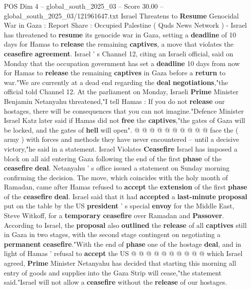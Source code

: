 \begin{textsample}{POS Dim 4 – global\_south\_2025\_03 – Score 30.00 – global\_south\_2025\_03/121961647.txt}  \label{ex:f4_pos_037}
Israel Threatens to \textbf{Resume} Genocidal War in Gaza : Report Share : Occupied Palestine ( Quds News Network ) - Israel has threatened to \textbf{resume} its genocide war in Gaza, setting a \textbf{deadline} of 10 days for Hamas to \textbf{release} the remaining \textbf{captives}, a move that violates the \textbf{ceasefire} \textbf{agreement}.
Israel ' s Channel 12, citing an Israeli official, said on Monday that the occupation government has set a \textbf{deadline} 10 days from now for Hamas to \textbf{release} the remaining \textbf{captives} in Gaza before a \textbf{return} to war."We are currently at a dead end regarding the \textbf{deal} \textbf{negotiations},"the official told Channel 12.
At the parliament on Monday, Israeli \textbf{Prime} Minister Benjamin Netanyahu threatened,"I tell Hamas : If you do not \textbf{release} our hostages, there will be consequences that you can not imagine."Defence Minister Israel Katz later said if Hamas did not \textbf{free} the \textbf{captives},"the gates of Gaza will be locked, and the gates of \textbf{hell} will open". @ @ @ @ @ @ @ @ @ @ face the ( army ) with forces and methods they have never encountered -- until a decisive victory,"he said in a statement.
Israel Violates \textbf{Ceasefire} Israel has imposed a block on all aid entering Gaza following the end of the first \textbf{phase} of the \textbf{ceasefire} \textbf{deal}.
Netanyahu ' s office issued a statement on Sunday morning confirming the decision.
The move, which coincides with the holy month of Ramadan, came after Hamas refused to \textbf{accept} the \textbf{extension} of the first \textbf{phase} of the \textbf{ceasefire} \textbf{deal}.
Israel said that it had \textbf{accepted} a \textbf{last-minute} \textbf{proposal} put on the table by the US \textbf{president} ' s special \textbf{envoy} for the Middle East, Steve Witkoff, for a \textbf{temporary} \textbf{ceasefire} over Ramadan and \textbf{Passover}.
According to Israel, the \textbf{proposal} also \textbf{outlined} the \textbf{release} of all \textbf{captives} still in Gaza in two stages, with the second stage contingent on negotiating a \textbf{permanent} \textbf{ceasefire}."With the end of \textbf{phase} one of the hostage \textbf{deal}, and in light of Hamas ' refusal to \textbf{accept} the US @ @ @ @ @ @ @ @ @ @ which Israel agreed, \textbf{Prime} Minister Netanyahu has decided that starting this morning all entry of goods and supplies into the Gaza Strip will cease,"the statement said."Israel will not allow a \textbf{ceasefire} without the \textbf{release} of our hostages.

\end{textsample}
